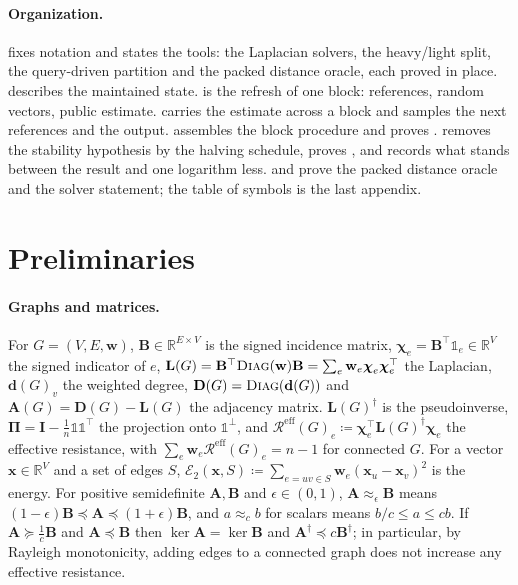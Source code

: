 \documentclass[11pt]{article}
\theoremstyle{remark}
\renewcommand{\AA}{\mathbf A}
\newcommand{\BB}{\mathbf B}
\newcommand{\cchi}{{\boldsymbol\chi}}
\newcommand{\dd}{\mathbf d}
\newcommand{\DD}{\mathbf D}
\newcommand{\II}{\mathbf I}
\newcommand{\LL}{\mathbf L}
\newcommand{\PPi}{{\boldsymbol\Pi}}
\newcommand{\ww}{\mathbf w}
\newcommand{\xx}{\mathbf x}
\newcommand{\Ecal}[1]{\mathcal E_{#1}}
\newcommand{\R}{\mathbb R}
\newcommand{\Rcal}{\mathcal{R}}
\newcommand{\Reff}{\Rcal^{\mathrm{eff}}}
\newcommand{\defeq}{\coloneqq}
\newcommand{\diag}{\textsc{Diag}}
\newcommand{\oone}{\mathds{1}}
\begin{document}
\paragraph{Organization.}
 fixes notation and states the tools:
the Laplacian solvers, the heavy/light split, the query-driven partition and
the packed distance oracle, each proved in place.
 describes the maintained state.
 is the refresh of one block: references, random vectors,
public estimate.
 carries the estimate across a block and samples the next
references and the output.
 assembles the block procedure and proves .
 removes the stability hypothesis by the halving schedule,
proves , and records what stands between the result and one
logarithm less.
 and  prove the packed distance oracle and
the solver statement; the table of symbols is the last appendix.

\section{Preliminaries}\label{sec:prelim}

\paragraph{Graphs and matrices.}
For $G=(V,E,\ww)$, $\BB\in\R^{E\times V}$ is the signed incidence matrix,
$\cchi_e=\BB^{\top}\oone_e\in\R^{V}$ the signed indicator of $e$,
$\LL(G)=\BB^{\top}\diag(\ww)\BB=\sum_e\ww_e\cchi_e\cchi_e^{\top}$ the
Laplacian, $\dd(G)_v$ the weighted degree, $\DD(G)=\diag(\dd(G))$ and
$\AA(G)=\DD(G)-\LL(G)$ the adjacency matrix.
$\LL(G)^{\dag}$ is the pseudoinverse, $\PPi=\II-\frac1n\oone\oone^{\top}$ the
projection onto $\oone^{\perp}$, and
$\Reff(G)_e\defeq\cchi_e^{\top}\LL(G)^{\dag}\cchi_e$ the effective resistance,
with $\sum_e\ww_e\Reff(G)_e=n-1$ for connected $G$.
For a vector $\xx\in\R^{V}$ and a set of edges $S$,
$\Ecal2(\xx,S)\defeq\sum_{e=uv\in S}\ww_e(\xx_u-\xx_v)^{2}$ is the energy.
For positive semidefinite $\AA,\BB$ and $\epsilon\in(0,1)$,
$\AA\approx_{\epsilon}\BB$ means $(1-\epsilon)\BB\preceq\AA\preceq(1+\epsilon)\BB$,
and $a\approx_{c}b$ for scalars means $b/c\le a\le cb$.
If $\AA\succeq\frac1{c}\BB$ and $\AA\preceq\BB$ then $\ker\AA=\ker\BB$ and
$\AA^{\dag}\preceq c\BB^{\dag}$; in particular, by Rayleigh monotonicity,
adding edges to a connected graph does not increase any effective
resistance.
\end{document}
